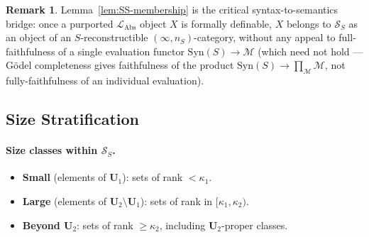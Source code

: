\documentclass[11pt]{article}
\theoremstyle{plain}
\theoremstyle{definition}
\newtheorem{remark}[theorem]{Remark}
\newcommand{\cS}{\mathcal{S}}
\newcommand{\cM}{\mathcal{M}}
\newcommand{\LAbs}{\mathcal{L}_{\mathrm{Abs}}}
\newcommand{\Syn}{\mathrm{Syn}}
\begin{document}
\begin{remark}
Lemma~\ref{lem:SS-membership} is the critical syntax-to-semantics bridge: once a purported $\LAbs$ object $X$ is formally definable, $X$ belongs to $\cS_S$ as an object of an $S$-reconstructible $(\infty, n_S)$-category, without any appeal to full-faithfulness of a single evaluation functor $\Syn(S) \to \cM$ (which need not hold --- G\"odel completeness gives faithfulness of the product $\Syn(S) \to \prod_\cM \cM$, not fully-faithfulness of an individual evaluation).
\end{remark}

\subsection{Size Stratification}\label{sec:size-stratification}

\paragraph{Size classes within $\cS_S$.}
\begin{itemize}
\item \textbf{Small} (elements of $\mathbf{U}_1$): sets of rank $< \kappa_1$.
\item \textbf{Large} (elements of $\mathbf{U}_2 \setminus \mathbf{U}_1$): sets of rank in $[\kappa_1, \kappa_2)$.
\item \textbf{Beyond $\mathbf{U}_2$}: sets of rank $\geq \kappa_2$, including $\mathbf{U}_2$-proper classes.
\end{itemize}
\end{document}
